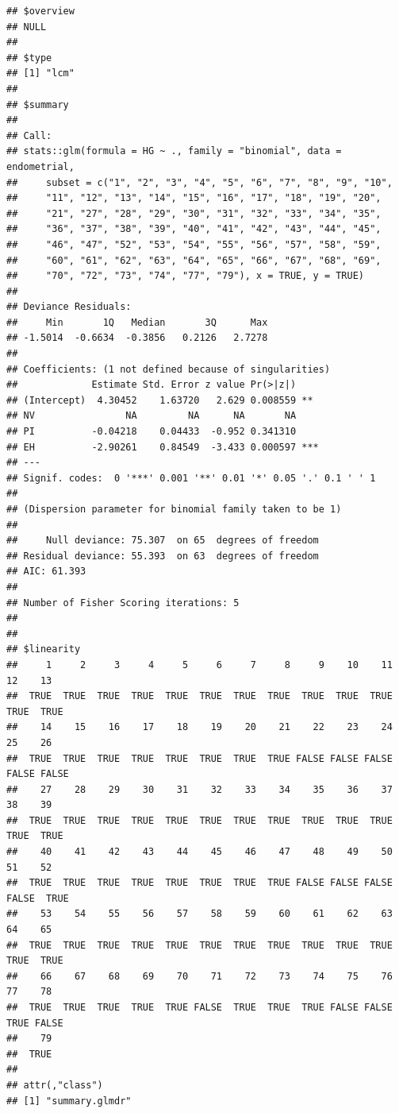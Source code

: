 \documentclass[
  ignorenonframetext,
]{beamer}
\begin{document}
\begin{frame}[fragile]{}
\begin{verbatim}
## $overview
## NULL
## 
## $type
## [1] "lcm"
## 
## $summary
## 
## Call:
## stats::glm(formula = HG ~ ., family = "binomial", data = endometrial, 
##     subset = c("1", "2", "3", "4", "5", "6", "7", "8", "9", "10", 
##     "11", "12", "13", "14", "15", "16", "17", "18", "19", "20", 
##     "21", "27", "28", "29", "30", "31", "32", "33", "34", "35", 
##     "36", "37", "38", "39", "40", "41", "42", "43", "44", "45", 
##     "46", "47", "52", "53", "54", "55", "56", "57", "58", "59", 
##     "60", "61", "62", "63", "64", "65", "66", "67", "68", "69", 
##     "70", "72", "73", "74", "77", "79"), x = TRUE, y = TRUE)
## 
## Deviance Residuals: 
##     Min       1Q   Median       3Q      Max  
## -1.5014  -0.6634  -0.3856   0.2126   2.7278  
## 
## Coefficients: (1 not defined because of singularities)
##             Estimate Std. Error z value Pr(>|z|)    
## (Intercept)  4.30452    1.63720   2.629 0.008559 ** 
## NV                NA         NA      NA       NA    
## PI          -0.04218    0.04433  -0.952 0.341310    
## EH          -2.90261    0.84549  -3.433 0.000597 ***
## ---
## Signif. codes:  0 '***' 0.001 '**' 0.01 '*' 0.05 '.' 0.1 ' ' 1
## 
## (Dispersion parameter for binomial family taken to be 1)
## 
##     Null deviance: 75.307  on 65  degrees of freedom
## Residual deviance: 55.393  on 63  degrees of freedom
## AIC: 61.393
## 
## Number of Fisher Scoring iterations: 5
## 
## 
## $linearity
##     1     2     3     4     5     6     7     8     9    10    11    12    13 
##  TRUE  TRUE  TRUE  TRUE  TRUE  TRUE  TRUE  TRUE  TRUE  TRUE  TRUE  TRUE  TRUE 
##    14    15    16    17    18    19    20    21    22    23    24    25    26 
##  TRUE  TRUE  TRUE  TRUE  TRUE  TRUE  TRUE  TRUE FALSE FALSE FALSE FALSE FALSE 
##    27    28    29    30    31    32    33    34    35    36    37    38    39 
##  TRUE  TRUE  TRUE  TRUE  TRUE  TRUE  TRUE  TRUE  TRUE  TRUE  TRUE  TRUE  TRUE 
##    40    41    42    43    44    45    46    47    48    49    50    51    52 
##  TRUE  TRUE  TRUE  TRUE  TRUE  TRUE  TRUE  TRUE FALSE FALSE FALSE FALSE  TRUE 
##    53    54    55    56    57    58    59    60    61    62    63    64    65 
##  TRUE  TRUE  TRUE  TRUE  TRUE  TRUE  TRUE  TRUE  TRUE  TRUE  TRUE  TRUE  TRUE 
##    66    67    68    69    70    71    72    73    74    75    76    77    78 
##  TRUE  TRUE  TRUE  TRUE  TRUE FALSE  TRUE  TRUE  TRUE FALSE FALSE  TRUE FALSE 
##    79 
##  TRUE 
## 
## attr(,"class")
## [1] "summary.glmdr"
\end{verbatim}
\end{frame}
\end{document}
